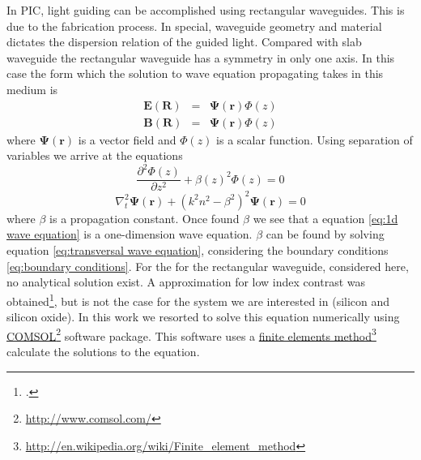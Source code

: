 \documentclass[12pt,twoside,english]{book}
\renewcommand{\~}{\perispomeni}%
\numberwithin{equation}{section}
\numberwithin{figure}{section}
\newcommand\fnurl[2]{%
 \href{#2}{#1}\footnote{\url{#2}}%
}
\begin{document}
In PIC, light guiding can be accomplished using rectangular waveguides. This is due to the fabrication process. In special, waveguide geometry and material dictates the dispersion relation of the guided light. Compared with slab waveguide the rectangular waveguide has a symmetry in only one axis. In this case the form which the solution to wave equation propagating takes in this medium is
\begin{subequations}
\begin{eqnarray}
\mathbf{E}\left(\mathbf{R}\right) & = & \mathbf{\Psi}\left(\mathbf{r}\right)\Phi\left(z\right)\label{eq:assumption E waveguide}\\
\mathbf{B}\left(\mathbf{R}\right) & = & \mathbf{\Psi}\left(\mathbf{r}\right)\Phi\left(z\right)\label{eq:assumption B waveguide}
\end{eqnarray}
\end{subequations}
where $\mathbf{\Psi}\left(\mathbf{r}\right)$ is a vector field and $\Phi\left(z\right)$ is a scalar function. Using separation of variables we arrive at the equations
\begin{equation}
\frac{\partial^{2}\Phi\left(z\right)}{\partial z^{2}}+\beta\left(z\right)^{2}\Phi\left(z\right)=0
\label{eq:1d wave equation}
\end{equation}
\begin{equation}
\nabla_{t}^{2}\mathbf{\Psi}\left(\mathbf{r}\right)+\left(k^2 n^2 -\beta^2 \right)^{2}\mathbf{\Psi}\left(\mathbf{r}\right)=0
\label{eq:transversal wave equation}
\end{equation}
where $\beta$ is a propagation constant. Once found $\beta$ we see that a equation \ref{eq:1d wave equation} is a one-dimension wave equation. $\beta$ can be found by solving equation \ref{eq:transversal wave equation}, considering the boundary conditions \ref{eq:boundary conditions}. For the for the rectangular waveguide, considered here, no analytical solution exist. A approximation for low index contrast was obtained\footcite{Marcatili:1969p2589}, but is not the case for the system we are interested in (silicon and silicon oxide). In this work we resorted to solve this equation numerically using \fnurl{COMSOL}{http://www.comsol.com/} software package. This software uses a \fnurl{finite elements method}{http://en.wikipedia.org/wiki/Finite_element_method} calculate the solutions to the equation.
\end{document}
